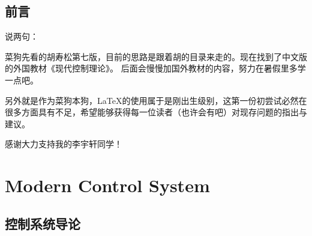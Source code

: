 \documentclass{NHNotebook}
\begin{document}
\maketitle

\frontmatter

\chapter*{前言}

说两句：

菜狗先看的胡寿松第七版，目前的思路是跟着胡的目录来走的。现在找到了中文版的外国教材《现代控制理论》。
后面会慢慢加国外教材的内容，努力在暑假里多学一点吧。

另外就是作为菜狗本狗，\LaTeX 的使用属于是刚出生级别，这第一份初尝试必然在很多方面具有不足，希望能够获得每一位读者（也许会有吧）对现存问题的指出与建议。

感谢大力支持我的李宇轩同学！    

\tableofcontents

\mainmatter


\part{Modern Control System}

\chapter{控制系统导论}
\end{document}
